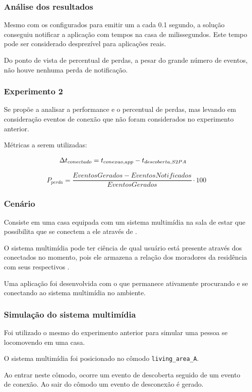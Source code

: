 \documentclass[aspectratio=169]{beamer}
\begin{document}
\begin{frame}
	\frametitle{Análise dos resultados}
	Mesmo com os \beacons configurados para emitir um \broadcast a cada 0.1 segundo, a solução conseguiu notificar a aplicação com tempos na casa de milissegundos. Este tempo pode ser considerado desprezível para aplicações reais.

	\bigskip

	Do ponto de vista de percentual de perdas, a pesar do grande número de eventos, não houve nenhuma perda de notificação.
\end{frame}

\begin{frame}
	\frametitle{Experimento 2}
	Se propõe a analisar a performance e o percentual de perdas, mas levando em consideração eventos de conexão que não foram considerados no experimento anterior.

	\bigskip

	Métricas a serem utilizadas:
	
	\begin{align}
		\label{equ:performance-ready}
		\Delta t_{conectado} &= t_{conexao,app} - t_{descoberta,S2PA}
	\end{align}
	
	\begin{equation}
		P_{perda} = \frac{EventosGerados - EventosNotificados}{EventosGerados} \cdot 100
	\end{equation}
\end{frame}

\begin{frame}
	\frametitle{Cenário}
	Consiste em uma casa equipada com um sistema multimídia na sala de estar que possibilita que \smartphones se conectem a ele através de \bluetooth.

	\bigskip

	O sistema multimídia pode ter ciência de qual usuário está presente através dos \smartphones conectados no momento, pois ele armazena a relação dos moradores da residência com seus respectivos \smartphones.

	\bigskip

	Uma aplicação \android foi desenvolvida com o \middleware \mhubcddl que permanece ativamente procurando e se conectando ao sistema multimídia no ambiente.
\end{frame}

\begin{frame}
	\frametitle{Simulação do sistema multimídia}
	Foi utilizado o mesmo \dataset do experimento anterior para simular uma pessoa se locomovendo em uma casa.

	\bigskip

	O sistema multimídia foi posicionado no cômodo \texttt{living\_area\_A}.

	\bigskip

	Ao entrar neste cômodo, ocorre um evento de descoberta seguido de um evento de conexão. Ao sair do cômodo um evento de desconexão é gerado.
\end{frame}
\end{document}
